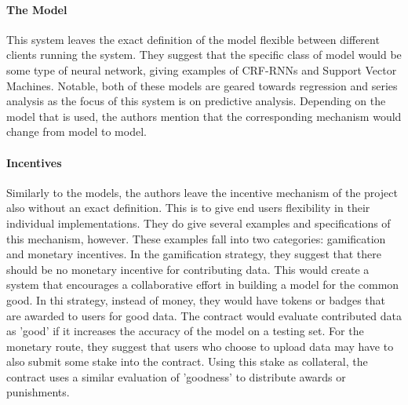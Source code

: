 \documentclass{article}
\begin{document}
    \paragraph{The Model}
    This system leaves the exact definition of the model flexible between different clients running the system.  They
    suggest that the specific class of model would be some type of neural network, giving examples of CRF-RNNs and
    Support Vector Machines.  Notable, both of these models are geared towards regression and series analysis as the
    focus of this system is on predictive analysis.  Depending on the model that is used, the authors mention that the
    corresponding mechanism would change from model to model.

    \paragraph{Incentives}
    Similarly to the models, the authors leave the incentive mechanism of the project also without an exact definition.
    This is to give end users flexibility in their individual implementations.  They do give several examples and
    specifications of this mechanism, however.  These examples fall into two categories: gamification and monetary
    incentives.  In the gamification strategy, they suggest that there should be no monetary incentive for contributing
    data.  This would create a system that encourages a collaborative effort in building a model for the common good.
    In thi strategy, instead of money, they would have tokens or badges that are awarded to users for good data.  The
    contract would evaluate contributed data as 'good' if it increases the accuracy of the model on a testing set.
    For the monetary route, they suggest that users who choose to upload data may have to also submit some stake into
    the contract.  Using this stake as collateral, the contract uses a similar evaluation of 'goodness' to distribute
    awards or punishments.
\end{document}
